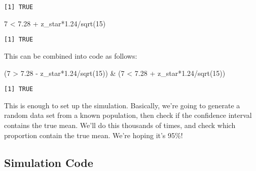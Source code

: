 \documentclass[
  letterpaper,
  DIV=11,
  numbers=noendperiod]{scrreprt}
\newenvironment{Shaded}{\begin{snugshade}}{\end{snugshade}}
\newcommand{\DecValTok}[1]{\textcolor[rgb]{0.68,0.00,0.00}{#1}}
\newcommand{\FloatTok}[1]{\textcolor[rgb]{0.68,0.00,0.00}{#1}}
\newcommand{\FunctionTok}[1]{\textcolor[rgb]{0.28,0.35,0.67}{#1}}
\newcommand{\NormalTok}[1]{\textcolor[rgb]{0.00,0.23,0.31}{#1}}
\newcommand{\SpecialCharTok}[1]{\textcolor[rgb]{0.37,0.37,0.37}{#1}}
\begin{document}
\begin{verbatim}
[1] TRUE
\end{verbatim}

\begin{Shaded}
\begin{Highlighting}[]
\DecValTok{7} \SpecialCharTok{\textless{}} \FloatTok{7.28} \SpecialCharTok{+}\NormalTok{ z\_star}\SpecialCharTok{*}\FloatTok{1.24}\SpecialCharTok{/}\FunctionTok{sqrt}\NormalTok{(}\DecValTok{15}\NormalTok{) }
\end{Highlighting}
\end{Shaded}

\begin{verbatim}
[1] TRUE
\end{verbatim}

This can be combined into code as follows:

\begin{Shaded}
\begin{Highlighting}[]
\NormalTok{(}\DecValTok{7} \SpecialCharTok{\textgreater{}} \FloatTok{7.28} \SpecialCharTok{{-}}\NormalTok{ z\_star}\SpecialCharTok{*}\FloatTok{1.24}\SpecialCharTok{/}\FunctionTok{sqrt}\NormalTok{(}\DecValTok{15}\NormalTok{)) }\SpecialCharTok{\&}\NormalTok{ (}\DecValTok{7} \SpecialCharTok{\textless{}} \FloatTok{7.28} \SpecialCharTok{+}\NormalTok{ z\_star}\SpecialCharTok{*}\FloatTok{1.24}\SpecialCharTok{/}\FunctionTok{sqrt}\NormalTok{(}\DecValTok{15}\NormalTok{))}
\end{Highlighting}
\end{Shaded}

\begin{verbatim}
[1] TRUE
\end{verbatim}

This is enough to set up the simulation. Basically, we're going to
generate a random data set from a known population, then check if the
confidence interval contains the true mean. We'll do this thousands of
times, and check which proportion contain the true mean. We're hoping
it's 95\%!

\hypertarget{simulation-code}{%
\subsection{Simulation Code}\label{simulation-code}}
\end{document}
